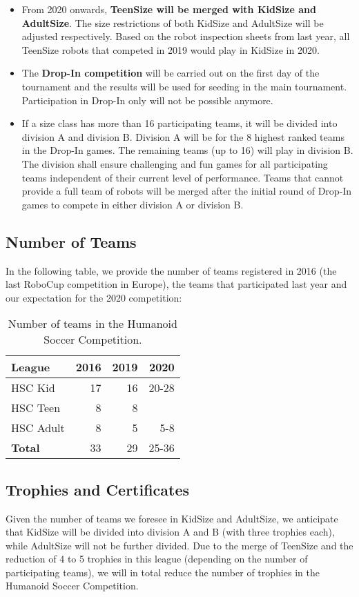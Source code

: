 \documentclass{article}
\begin{document}
\begin{itemize}
\item From 2020 onwards, \textbf{TeenSize will be merged with KidSize and AdultSize}. The size restrictions of both KidSize and AdultSize will be adjusted respectively. Based on the robot inspection sheets from last year, all TeenSize robots that competed in 2019 would play in KidSize in 2020.
\item The \textbf{Drop-In competition} will be carried out on the first day of the tournament and the results will be used for seeding in the main tournament. Participation in Drop-In only will not be possible anymore.
\item If a size class has more than 16 participating teams, it will be divided into division A and division B. Division A will be for the 8 highest ranked teams in the Drop-In games. The remaining teams (up to 16) will play in division B. The division shall ensure challenging and fun games for all participating teams independent of their current level of performance. Teams that cannot provide a full team of robots will be merged after the initial round of Drop-In games to compete in either division A or division B.
\end{itemize}

\subsection{Number of Teams}
In the following table, we provide the number of teams registered in 2016 (the last RoboCup competition in Europe), the teams that participated last year and our expectation for the 2020 competition:

\begin{table}[h]
  \centering
  \begin{tabular}{l | r | r | r}
    League & 2016 & 2019 & 2020\\
    \hline
    HSC Kid & 17 & 16 & 20-28\\ 
    HSC Teen & 8 & 8 & \\ 
    HSC Adult & 8 & 5 & 5-8\\ 
    \hline
    \textbf{Total} & 33 & 29 & 25-36
  \end{tabular}
  \caption{Number of teams in the Humanoid Soccer Competition.}
\end{table}

\subsection{Trophies and Certificates}
Given the number of teams we foresee in KidSize and AdultSize, we anticipate that KidSize will be divided into division A and B (with three trophies each), while AdultSize will not be further divided. Due to the merge of TeenSize and the reduction of 4 to 5 trophies in this league (depending on the number of participating teams), we will in total reduce the number of trophies in the Humanoid Soccer Competition.
\end{document}
